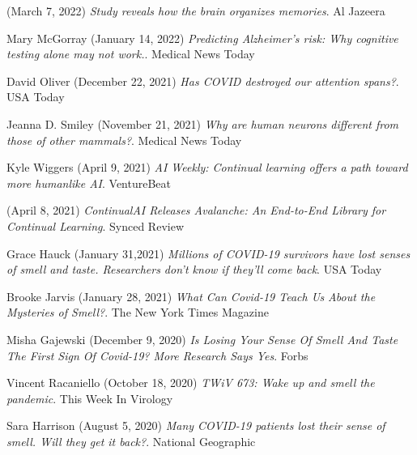 \documentclass[10pt]{cooperCV2}
\begin{document}
 
\begin{etaremune}[itemindent=-1.5\bibhang, topsep=0pt,
				   itemsep=\bibsep,partopsep=0pt,parsep=0pt,leftmargin={\bibhang+\widthof{[999]}}] 
    
    
    \item  (March 7, 2022) \textit{Study reveals how the brain organizes memories}. Al Jazeera
     
	
    \item Mary McGorray (January 14, 2022) \textit{Predicting Alzheimer’s risk: Why cognitive testing alone may not work.}. Medical News Today
     
	
    \item David Oliver (December 22, 2021) \textit{Has COVID destroyed our attention spans?}. USA Today
     
	
    \item Jeanna D. Smiley (November 21, 2021) \textit{Why are human neurons different from those of other mammals?}. Medical News Today
     
	
    \item Kyle Wiggers (April 9, 2021) \textit{AI Weekly: Continual learning offers a path toward more humanlike AI}. VentureBeat
     
	
    \item  (April 8, 2021) \textit{ContinualAI Releases Avalanche: An End-to-End Library for Continual Learning}. Synced Review
     
	
    \item Grace Hauck (January 31,2021) \textit{Millions of COVID-19 survivors have lost senses of smell and taste. Researchers don't know if they'll come back}. USA Today
     
	
    \item Brooke Jarvis (January 28, 2021) \textit{What Can Covid-19 Teach Us About the Mysteries of Smell?}. The New York Times Magazine
     
	
    \item Misha Gajewski (December 9, 2020) \textit{Is Losing Your Sense Of Smell And Taste The First Sign Of Covid-19? More Research Says Yes}. Forbs
     
	
    \item Vincent Racaniello (October 18, 2020) \textit{TWiV 673: Wake up and smell the pandemic}. This Week In Virology
     
	
    \item Sara Harrison (August 5, 2020) \textit{Many COVID-19 patients lost their sense of smell. Will they get it back?}. National Geographic
     

\end{etaremune}
\end{document}
